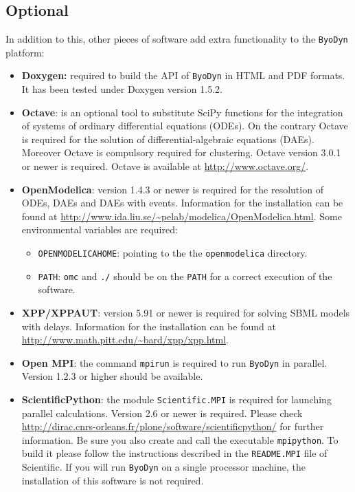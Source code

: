 \documentclass[a4paper, 11pt]{article}
\begin{document}
\subsection{Optional}
In addition to this, other pieces of software add extra functionality to the \texttt{ByoDyn} platform:
\begin{itemize}
\item
  \textbf{Doxygen:} required to build the API of \texttt{ByoDyn} in HTML and PDF formats.
  It has been tested under Doxygen version 1.5.2.
\item
  \textbf{Octave}: is an optional tool to substitute SciPy functions for the integration of systems of ordinary differential equations (ODEs).
  On the contrary Octave is required for the solution of differential-algebraic equations (DAEs).
  Moreover Octave is compulsory required for clustering.
  Octave version 3.0.1 or newer is required.
  Octave is available at \url{http://www.octave.org/}.  
\item
  \textbf{OpenModelica}: version 1.4.3 or newer is required for the resolution of ODEs, DAEs and DAEs with events.
  Information for the installation can be found at \url{http://www.ida.liu.se/~pelab/modelica/OpenModelica.html}.
  Some environmental variables are required:
  \begin{itemize}
  \item \texttt{OPENMODELICAHOME}: pointing to the the \texttt{openmodelica} directory.
  \item \texttt{PATH}: \texttt{omc} and \texttt{./} should be on the \texttt{PATH} for a correct execution of the software.
  \end{itemize}
\item
  \textbf{XPP/XPPAUT}: version 5.91 or newer is required for solving SBML models with delays.
  Information for the installation can be found at \url{http://www.math.pitt.edu/~bard/xpp/xpp.html}.
\item
  \textbf{Open MPI}: the command \texttt{mpirun} is required to run \texttt{ByoDyn} in parallel.
  Version 1.2.3 or higher should be available.
\item
  \textbf{ScientificPython}: the module \texttt{Scientific.MPI} is required for launching parallel calculations.
  Version 2.6 or newer is required.
  Please check \url{http://dirac.cnrs-orleans.fr/plone/software/scientificpython/} for further information.
  Be sure you also create and call the executable \texttt{mpipython}.
  To build it please follow the instructions described in the \texttt{README.MPI} file of Scientific.
  If you will run \texttt{ByoDyn} on a single processor machine, the installation of this software is not required.
\end{itemize}
\end{document}
